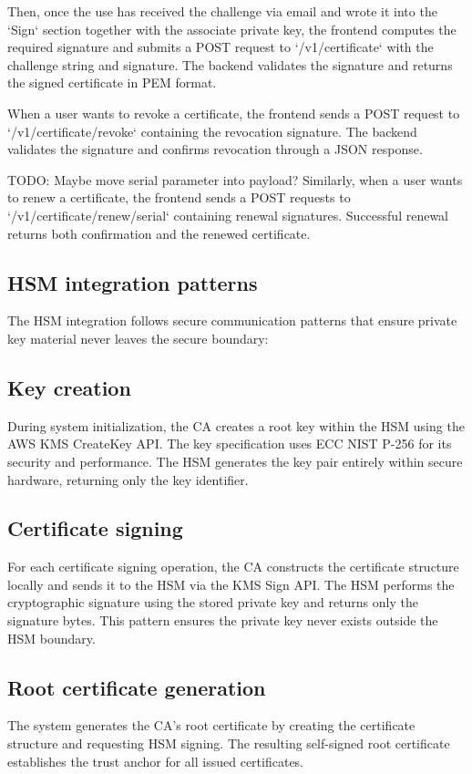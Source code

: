 Then, once the use has received the challenge via email and wrote it into the `Sign` section
together with the associate private key, the frontend computes the required signature and submits 
a POST request to `/v1/certificate` with the challenge string and signature. 
The backend validates the signature and returns the signed certificate in PEM format.

When a user wants to revoke a certificate, the frontend sends a POST request to 
`/v1/certificate/revoke` containing the revocation signature. The backend validates 
the signature and confirms revocation through a JSON response.

{\color{red}TODO: Maybe move serial parameter into payload?}
Similarly, when a user wants to renew a certificate, the frontend sends a POST 
requests to `/v1/certificate/renew/{serial}` containing renewal signatures. Successful renewal 
returns both confirmation and the renewed certificate.

\subsection{HSM integration patterns}

The HSM integration follows secure communication patterns 
that ensure private key material never leaves the secure boundary:

\subsection{Key creation}
During system initialization, the CA creates a root key 
within the HSM using the AWS KMS CreateKey API. The key specification uses 
ECC NIST P-256 for its security and performance. The HSM generates the key 
pair entirely within secure hardware, returning only the key identifier.

\subsection{Certificate signing}
For each certificate signing operation, the CA 
constructs the certificate structure locally and sends it to the HSM via the 
KMS Sign API. The HSM performs the cryptographic signature using the stored 
private key and returns only the signature bytes. This pattern ensures the 
private key never exists outside the HSM boundary.

\subsection{Root certificate generation}
The system generates the CA's root certificate 
by creating the certificate structure and requesting HSM signing. The resulting 
self-signed root certificate establishes the trust anchor for all issued certificates.

